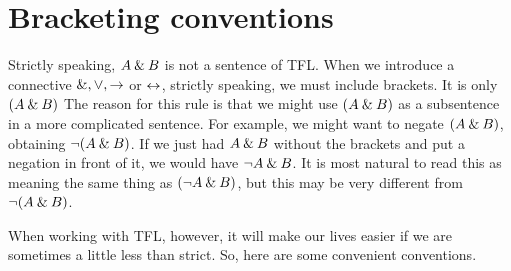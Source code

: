 %
%
%
% 
%

%
%
%
%





\section{Bracketing conventions}
\label{TFLconventions}


Strictly speaking, $A\mathbin{\&} B$ is not a sentence of TFL. When we introduce a connective $\mathbin{\&},\vee,\rightarrow$ or $\leftrightarrow$, strictly speaking, we must include brackets. It is only $(A\mathbin{\&} B)$ 
The reason for this rule is that we might use $(A\mathbin{\&} B)$ as a subsentence in a more complicated sentence. For example, we might want to negate $(A\mathbin{\&} B)$, obtaining $\neg(A\mathbin{\&} B)$. If we just had $A \mathbin{\&} B$ without the brackets and put a negation in front of it, we would have $\neg A \mathbin{\&} B$. It is most natural to read this as meaning the same thing as $(\neg A \mathbin{\&} B)$, but this may be very different from $\neg(A\mathbin{\&} B)$.

When working with TFL, however, it will make our lives easier if we are sometimes a little less than strict. So, here are some convenient conventions.

